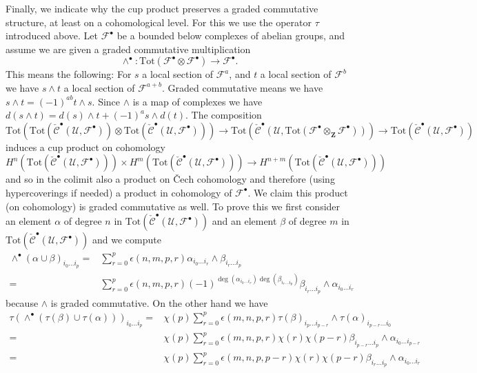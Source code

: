 \medskip\noindent
Finally, we indicate why the cup product preserves a graded commutative
structure, at least on a cohomological level. For this we use the operator
$\tau$ introduced above. Let ${\mathcal F}^\bullet$ be a bounded below
complexes of abelian groups, and assume we are given a graded commutative
multiplication
$$
\wedge^\bullet :
\text{Tot}({\mathcal F}^\bullet\otimes {\mathcal F}^\bullet)
\longrightarrow
{\mathcal F}^\bullet.
$$
This means the following: For $s$ a local section of
${\mathcal F}^a$, and $t$ a local section of ${\mathcal F}^b$
we have $s \wedge t$ a local section of ${\mathcal F}^{a + b}$.
Graded commutative means we have
$s \wedge t = (-1)^{ab} t \wedge s$. Since $\wedge$ is a map
of complexes we have
$d(s\wedge t) = d(s) \wedge t + (-1)^a s \wedge d(t)$.
The composition
$$
\text{Tot}(
\text{Tot}(\check{\mathcal{C}}^\bullet({\mathcal U}, {\mathcal F}^\bullet))
\otimes
\text{Tot}(\check{\mathcal{C}}^\bullet({\mathcal U}, {\mathcal F}^\bullet))
)
\to
\text{Tot}(
\check{\mathcal{C}}^\bullet({\mathcal U},
\text{Tot}({\mathcal F}^\bullet\otimes_{\mathbf Z}{\mathcal F}^\bullet))
)
\to
\text{Tot}(\check{\mathcal{C}}^\bullet({\mathcal U}, {\mathcal F}^\bullet))
$$
induces a cup product on cohomology
$$
H^n(
\text{Tot}(\check{\mathcal{C}}^\bullet({\mathcal U}, {\mathcal F}^\bullet))
)
\times
H^m(
\text{Tot}(\check{\mathcal{C}}^\bullet({\mathcal U}, {\mathcal F}^\bullet))
)
\longrightarrow
H^{n + m}(
\text{Tot}(\check{\mathcal{C}}^\bullet({\mathcal U}, {\mathcal F}^\bullet))
)
$$
and so in the colimit also a product on {\v C}ech cohomology
and therefore (using hypercoverings if needed) a product
in cohomology of ${\mathcal F}^\bullet$. We claim this product
(on cohomology) is graded commutative as well. To prove this
we first consider an element $\alpha$ of degree $n$ in
$\text{Tot}(\check{\mathcal{C}}^\bullet({\mathcal U}, {\mathcal F}^\bullet))$
and an element $\beta$ of degree $m$ in
$\text{Tot}(\check{\mathcal{C}}^\bullet({\mathcal U}, {\mathcal F}^\bullet))$
and we compute
\begin{align*}
\wedge^\bullet(\alpha \cup \beta)_{i_0 \ldots i_p}
= &
\sum\nolimits_{r = 0}^p
\epsilon(n, m, p, r)
\alpha_{i_0 \ldots i_r} \wedge \beta_{i_r \ldots i_p} \\
= &
\sum\nolimits_{r = 0}^p
\epsilon(n, m, p, r)
(-1)^{\deg(\alpha_{i_0 \ldots i_r})\deg(\beta_{i_r \ldots i_p})}
\beta_{i_r \ldots i_p} \wedge \alpha_{i_0 \ldots i_r}
\end{align*}
because $\wedge$ is graded commutative. On the other hand we have
\begin{align*}
\tau(\wedge^\bullet(\tau(\beta) \cup \tau(\alpha)))_{i_0 \ldots i_p}
= &
\chi(p)
\sum\nolimits_{r = 0}^p
\epsilon(m, n, p, r)
\tau(\beta)_{i_p \ldots i_{p - r}} \wedge \tau(\alpha)_{i_{p - r} \ldots i_0}
\\
= &
\chi(p)
\sum\nolimits_{r = 0}^p
\epsilon(m, n, p, r) \chi(r) \chi(p - r)
\beta_{i_{p - r} \ldots i_p} \wedge \alpha_{i_0 \ldots i_{p - r}}
\\
= &
\chi(p)
\sum\nolimits_{r = 0}^p
\epsilon(m, n, p, p - r) \chi(r) \chi(p - r)
\beta_{i_r \ldots i_p} \wedge \alpha_{i_0 \ldots i_r}
\end{align*}
